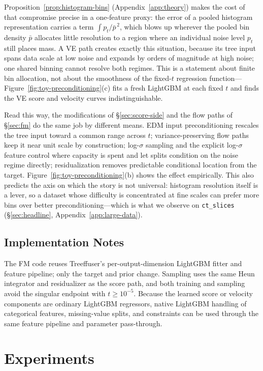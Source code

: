 \documentclass{article}
\begin{document}
Proposition~\ref{prop:histogram-bins} (Appendix~\ref{app:theory}) makes the cost of that compromise precise in a one-feature proxy: the error of a pooled histogram representation carries a term $\int p_t / \bar p^{\,2}$, which blows up wherever the pooled bin density $\bar p$ allocates little resolution to a region where an individual noise level $p_t$ still places mass. A VE path creates exactly this situation, because its tree input spans data scale at low noise and expands by orders of magnitude at high noise; one shared binning cannot resolve both regimes. This is a statement about finite bin allocation, not about the smoothness of the fixed-$t$ regression function---Figure~\ref{fig:toy-preconditioning}(c) fits a fresh LightGBM at each fixed $t$ and finds the VE score and velocity curves indistinguishable.

Read this way, the modifications of \S\ref{sec:score-side} and the flow paths of \S\ref{sec:fm} do the same job by different means. EDM input preconditioning rescales the tree input toward a common range across $t$; variance-preserving flow paths keep it near unit scale by construction; log-$\sigma$ sampling and the explicit log-$\sigma$ feature control where capacity is spent and let splits condition on the noise regime directly; residualization removes predictable conditional location from the target. Figure~\ref{fig:toy-preconditioning}(b) shows the effect empirically. This also predicts the axis on which the story is not universal: histogram resolution itself is a lever, so a dataset whose difficulty is concentrated at fine scales can prefer more bins over better preconditioning---which is what we observe on \texttt{ct\_slices} (\S\ref{sec:headline}, Appendix~\ref{app:large-data}).

\subsection{Implementation Notes}\label{sec:impl}
The FM code reuses Treeffuser's per-output-dimension LightGBM fitter and feature pipeline; only the target and prior change. Sampling uses the same Heun integrator and residualizer as the score path, and both training and sampling avoid the singular endpoint with $t \geq 10^{-5}$. Because the learned score or velocity components are ordinary LightGBM regressors, native LightGBM handling of categorical features, missing-value splits, and constraints can be used through the same feature pipeline and parameter pass-through.

\section{Experiments}\label{sec:exp}
\end{document}
